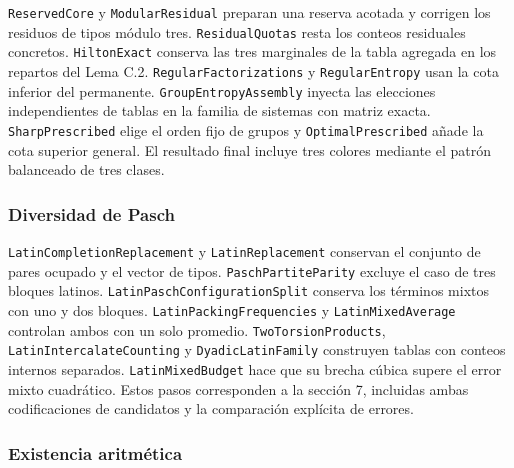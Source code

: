 \documentclass[spanish,11pt,a4paper]{article}
\begin{document}
\texttt{Reserved\allowbreak{}Core} y \texttt{Modular\allowbreak{}Residual} preparan una reserva acotada y corrigen los residuos de tipos módulo tres. \texttt{Residual\allowbreak{}Quotas} resta los conteos residuales concretos. \texttt{Hilton\allowbreak{}Exact} conserva las tres marginales de la tabla agregada en los repartos del Lema C.2. \texttt{Regular\allowbreak{}Factorizations} y \texttt{Regular\allowbreak{}Entropy} usan la cota inferior del permanente. \texttt{Group\allowbreak{}Entropy\allowbreak{}Assembly} inyecta las elecciones independientes de tablas en la familia de sistemas con matriz exacta. \texttt{Sharp\allowbreak{}Prescribed} elige el orden fijo de grupos y \texttt{Optimal\allowbreak{}Prescribed} añade la cota superior general. El resultado final incluye tres colores mediante el patrón balanceado de tres clases.

\subsubsection{Diversidad de Pasch}\label{diversidad-de-pasch}

\texttt{Latin\allowbreak{}Completion\allowbreak{}Replacement} y \texttt{Latin\allowbreak{}Replacement} conservan el conjunto de pares ocupado y el vector de tipos. \texttt{Pasch\allowbreak{}Partite\allowbreak{}Parity} excluye el caso de tres bloques latinos. \texttt{Latin\allowbreak{}Pasch\allowbreak{}Configuration\allowbreak{}Split} conserva los términos mixtos con uno y dos bloques. \texttt{Latin\allowbreak{}Packing\allowbreak{}Frequencies} y \texttt{Latin\allowbreak{}Mixed\allowbreak{}Average} controlan ambos con un solo promedio. \texttt{Two\allowbreak{}Torsion\allowbreak{}Products}, \texttt{Latin\allowbreak{}Intercalate\allowbreak{}Counting} y \texttt{Dyadic\allowbreak{}Latin\allowbreak{}Family} construyen tablas con conteos internos separados. \texttt{Latin\allowbreak{}Mixed\allowbreak{}Budget} hace que su brecha cúbica supere el error mixto cuadrático. Estos pasos corresponden a la sección 7, incluidas ambas codificaciones de candidatos y la comparación explícita de errores.

\subsubsection{Existencia aritmética}\label{existencia-aritmuxe9tica}
\end{document}
